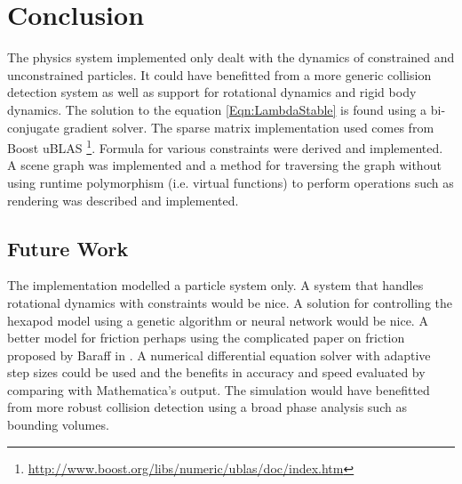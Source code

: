 \chapter{Conclusion}
The physics system implemented only dealt with the dynamics of constrained and
unconstrained particles. It could have benefitted from a more generic collision
detection system as well as support for rotational dynamics and rigid body
dynamics. The solution to the equation \ref{Eqn:LambdaStable} is found using a
bi-conjugate gradient solver. The sparse matrix implementation used comes from
Boost uBLAS
\footnote{\url{http://www.boost.org/libs/numeric/ublas/doc/index.htm}}. Formula
for various constraints were derived and implemented. A scene graph was
implemented and a method for traversing the graph without using runtime
polymorphism (i.e. virtual functions) to perform operations such as rendering
was described and implemented.

\section{Future Work}
The implementation modelled a particle system only. A system that handles
rotational dynamics with constraints would be nice. A solution for controlling
the hexapod model using a genetic algorithm or neural network would be nice. A
better model for friction perhaps using the complicated paper on friction
proposed by Baraff in \cite{BaraffFriction}. A numerical differential equation
solver with adaptive step sizes could be used and the benefits in accuracy and
speed evaluated by comparing with Mathematica's output. The simulation would
have benefitted from more robust collision detection using a broad phase
analysis such as bounding volumes. 
